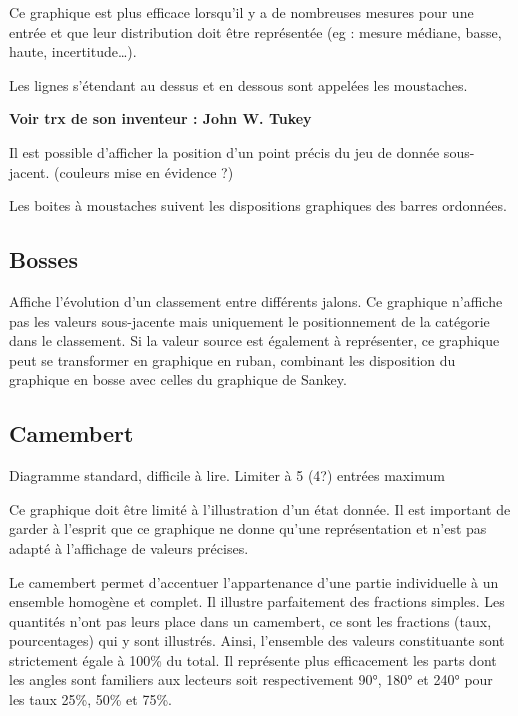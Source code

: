 \documentclass[a4paper,12pt]{article}
\begin{document}
\begin{multicols}{2}
Ce graphique est plus efficace lorsqu'il y a de nombreuses mesures pour une entrée et que leur distribution doit être représentée (eg : mesure médiane, basse, haute, incertitude\ldots{}). \autocite{mikeyiHowChooseRight2020}

Les lignes s'étendant au dessus et en dessous sont appelées les moustaches. \autocite{wilkeVisualizingManyDistributions2019}

\textbf{Voir trx de son inventeur : John W. Tukey}

Il est possible d'afficher la position d'un point précis du jeu de donnée sous-jacent. (couleurs mise en évidence ?)

Les boites à moustaches suivent les dispositions graphiques des barres ordonnées. \autocite{stephenfewComponentlevelGraphDesign2012}
\subsection*{Bosses}
\label{sec:org64cf13d}
Affiche l'évolution d'un classement entre différents jalons. \autocite{mikeyiHowChooseRight2020,alansmithLexiqueVisuel}  Ce graphique n'affiche pas les valeurs sous-jacente mais uniquement le positionnement de la catégorie dans le classement. \autocite{jonathanschwabishTime2021} Si la valeur source est également à représenter, ce graphique peut se transformer en graphique en ruban, combinant les disposition du graphique en bosse avec celles du graphique de Sankey. \autocite{jonathanschwabishTime2021}
\subsection*{Camembert}
\label{sec:orgb31f527}
Diagramme standard, difficile à lire. \autocite{alansmithLexiqueVisuel}
Limiter à 5 (4?) entrées maximum \autocite{mikeyiHowChooseRight2020}

Ce graphique doit être limité à l'illustration d'un état donnée. Il est important de garder à l'esprit que ce graphique ne donne qu'une représentation et n'est pas adapté à l'affichage de valeurs précises. \autocite{jonathanschwabishParttowhole2021}

Le camembert permet d'accentuer l'appartenance d'une partie individuelle à un ensemble homogène et complet. Il illustre parfaitement des fractions simples.\autocite{wilkeDirectoryVisualizations2019} Les quantités n'ont pas leurs place dans un camembert, ce sont les fractions (taux, pourcentages) qui y sont illustrés. Ainsi, l'ensemble des valeurs constituante sont strictement égale à 100\% du total.\autocite{wilkeVisualizingAmounts2019} Il représente plus efficacement les parts dont les angles sont familiers aux lecteurs soit respectivement 90°, 180° et 240° pour les taux 25\%, 50\% et 75\%.


\end{multicols}
\end{document}
